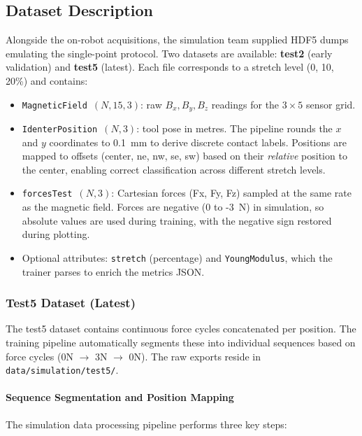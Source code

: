 \documentclass[11pt,a4paper]{article}
\begin{document}
\subsection{Dataset Description}
Alongside the on-robot acquisitions, the simulation team supplied HDF5 dumps emulating the
single-point protocol. Two datasets are available: \textbf{test2} (early validation) and \textbf{test5} (latest).
Each file corresponds to a stretch level (0, 10, 20\%) and contains:
\begin{itemize}[leftmargin=1.5em]
    \item \texttt{MagneticField}~\((N, 15, 3)\): raw \(B_x, B_y, B_z\) readings for the \(3\times5\) sensor grid.
    \item \texttt{IdenterPosition}~\((N, 3)\): tool pose in metres. The pipeline rounds the \(x\) and \(y\)
          coordinates to 0.1~mm to derive discrete contact labels. Positions are mapped to offsets (center, ne, nw, se, sw) based on their \emph{relative} position to the center, enabling correct classification across different stretch levels.
    \item \texttt{forcesTest}~\((N, 3)\): Cartesian forces (Fx, Fy, Fz) sampled at the same rate as the
          magnetic field. Forces are negative (0 to -3~N) in simulation, so absolute values are used during training, with the negative sign restored during plotting.
    \item Optional attributes: \texttt{stretch} (percentage) and \texttt{YoungModulus}, which the trainer
          parses to enrich the metrics JSON.
\end{itemize}

\subsubsection{Test5 Dataset (Latest)}
The test5 dataset contains continuous force cycles concatenated per position. The training pipeline automatically segments these into individual sequences based on force cycles (0N $\rightarrow$ 3N $\rightarrow$ 0N). The raw exports reside in \texttt{data/simulation/test5/}. 

\paragraph{Sequence Segmentation and Position Mapping}
The simulation data processing pipeline performs three key steps:
\end{document}
